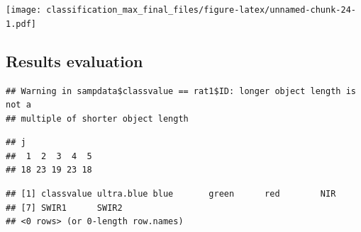 \documentclass[]{article}
\newenvironment{Shaded}{\begin{snugshade}}{\end{snugshade}}
\newcommand{\DataTypeTok}[1]{\textcolor[rgb]{0.13,0.29,0.53}{#1}}
\newcommand{\DecValTok}[1]{\textcolor[rgb]{0.00,0.00,0.81}{#1}}
\newcommand{\KeywordTok}[1]{\textcolor[rgb]{0.13,0.29,0.53}{\textbf{#1}}}
\newcommand{\NormalTok}[1]{#1}
\newcommand{\OperatorTok}[1]{\textcolor[rgb]{0.81,0.36,0.00}{\textbf{#1}}}
\newcommand{\StringTok}[1]{\textcolor[rgb]{0.31,0.60,0.02}{#1}}
\begin{document}
\texttt{[image: classification\_max\_final\_files/figure-latex/unnamed-chunk-24-1.pdf]}

\hypertarget{results-evaluation}{%
\subsection{Results evaluation}\label{results-evaluation}}

\begin{Shaded}
\end{Shaded}

\begin{verbatim}
## Warning in sampdata$classvalue == rat1$ID: longer object length is not a
## multiple of shorter object length
\end{verbatim}

\begin{Shaded}
\end{Shaded}

\begin{verbatim}
## j
##  1  2  3  4  5 
## 18 23 19 23 18
\end{verbatim}

\begin{Shaded}
\end{Shaded}

\begin{verbatim}
## [1] classvalue ultra.blue blue       green      red        NIR       
## [7] SWIR1      SWIR2     
## <0 rows> (or 0-length row.names)
\end{verbatim}
\end{document}
